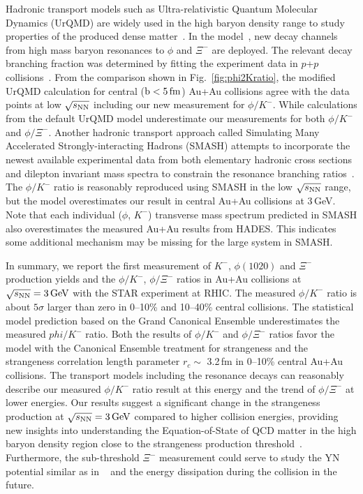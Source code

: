 \documentclass[%
 reprint,	
showpacs,
 amsmath,amssymb,
 aps,
 prc,
]{revtex4-1}
\begin{document}
Hadronic transport models such as Ultra-relativistic Quantum Molecular Dynamics (UrQMD) are widely used in the high baryon density range to study properties of the produced dense matter~\cite{urQMD,UrQMD_2}. In the model~\cite{Steinheimer_2015_UrQMD}, new decay channels from high mass baryon resonances to $\phi$ and $\Xi^-$ are deployed. The relevant decay branching fraction was determined by fitting the experiment data in $p$+$p$ collisions~\cite{ANKE_phi}. From the comparison shown in Fig.~\ref{fig:phi2Kratio}, the modified UrQMD calculation for central ($\rm{b}<5\,\rm{fm}$) Au+Au collisions agree with the data points at low ${\sqrt{s_{\rm NN}}}$ including our new measurement for $\phi/K^-$.
While calculations from the default UrQMD model underestimate our measurements for both $\phi/K^-$ and $\phi/\Xi^-$.   
Another hadronic transport approach called Simulating Many Accelerated Strongly-interacting Hadrons (SMASH) attempts to incorporate the newest available experimental data from both elementary hadronic cross sections and dilepton invariant mass spectra to constrain the resonance branching ratios~\cite{Elfner_SMASH}. The $\phi/K^-$ ratio is reasonably reproduced using SMASH in the low ${\sqrt{s_{\rm NN}}}$ range, but the model overestimates our result in central Au+Au collisions at 3\,GeV. Note that each individual ($\phi$, $K^-$) transverse mass spectrum predicted in SMASH also overestimates the measured Au+Au results from HADES.
This indicates some additional mechanism may be missing for the large system in SMASH.


In summary, we report the first measurement of $K^-$, $\phi(1020)$ and $\Xi^{-}$ production yields  and the $\phi/K^-$, $\phi/\Xi^-$ ratios in Au+Au collisions at ${\sqrt{s_{\rm NN}} = \rm{3\,GeV}}$ with the STAR experiment at RHIC. The measured $\phi/K^-$ ratio is about $5\sigma$ larger than zero in 0--10\% and 10--40\% central collisions. The statistical model prediction based on the Grand Canonical Ensemble underestimates the measured $phi/K^-$ ratio. Both the results of $\phi/K^-$ and $\phi/\Xi^-$ ratios favor the model with the Canonical Ensemble treatment for strangeness and the strangeness correlation length parameter $r_c \sim$ 3.2\,fm in 0--10\% central Au+Au collisions. The transport models including the resonance decays can reasonably describe our measured $\phi/K^-$ ratio result at this energy and the trend of $\phi/\Xi^-$ at lower energies. Our results suggest a significant change in the strangeness production at ${\sqrt{s_{\rm NN}} = \rm{3\,GeV}}$ compared to higher collision energies, providing new insights into understanding the Equation-of-State of QCD matter in the high baryon density region close to the strangeness production threshold~\cite{KO_sQM17,yong2021double}. Furthermore, the sub-threshold $\Xi^-$ measurement could serve to study the YN potential similar as in ~\cite{Ks0_Lambda_HADES} and the energy dissipation during the collision in the future. 
\end{document}
